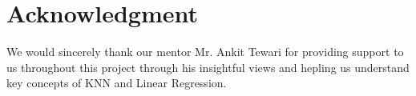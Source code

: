 \section{Acknowledgment }

\begin{block}
\color{gray}

We would sincerely thank our mentor  Mr. Ankit Tewari for providing support to us throughout this project through his insightful views and hepling us understand key concepts of KNN and Linear Regression. 

\end{block}